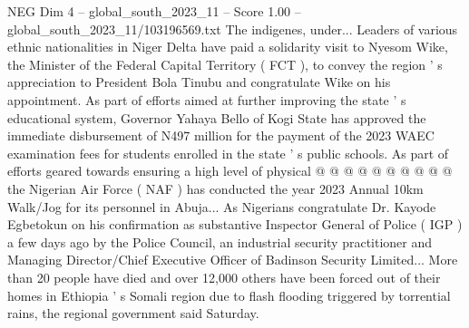\begin{textsample}{NEG Dim 4 – global\_south\_2023\_11 – Score 1.00 – global\_south\_2023\_11/103196569.txt}
The indigenes, under...
Leaders of various ethnic nationalities in Niger Delta have paid a solidarity visit to Nyesom Wike, the Minister of the Federal Capital Territory ( FCT ), to convey the region ' s appreciation to President Bola Tinubu and congratulate Wike on his appointment.
As part of efforts aimed at further improving the state ' s educational system, Governor Yahaya Bello of Kogi State has approved the immediate disbursement of N497 million for the payment of the 2023 WAEC examination fees for students enrolled in the state ' s public schools.
As part of efforts geared towards ensuring a high level of physical @ @ @ @ @ @ @ @ @ @ the Nigerian Air Force ( NAF ) has conducted the year 2023 Annual 10km Walk/Jog for its personnel in Abuja...
As Nigerians congratulate Dr.
Kayode Egbetokun on his confirmation as substantive Inspector General of Police ( IGP ) a few days ago by the Police Council, an industrial security practitioner and Managing Director/Chief Executive Officer of Badinson Security Limited...
More than 20 people have died and over 12,000 others have been forced out of their homes in Ethiopia ' s Somali region due to flash flooding triggered by torrential rains, the regional government said Saturday.

\end{textsample}
